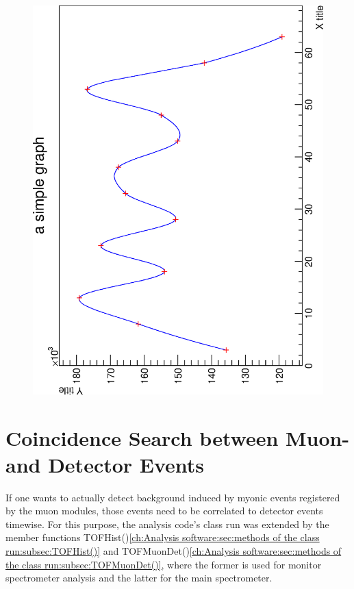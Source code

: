   \begin{figure}
	\label{fig:CoRatesPMT}
	
  	\includegraphics[angle = -90, width = 0.9 \textwidth]{graphics/cobalt/876_parallel_good.eps}
  \end{figure}

  
  \section{Coincidence Search between Muon- and Detector Events}
  \label{ch:Analysis:sec:Monitor Spectrometer Measurements}
  If one wants to actually detect background induced by myonic events registered by the muon modules, those events need to be correlated to detector events timewise. For this purpose, the analysis code's class run was extended by the member functions TOFHist()\ref{ch:Analysis software:sec:methods of the class run:subsec:TOFHist()} and TOFMuonDet()\ref{ch:Analysis software:sec:methods of the class run:subsec:TOFMuonDet()}, where the former is used for monitor spectrometer analysis and the latter for the main spectrometer. 
  
